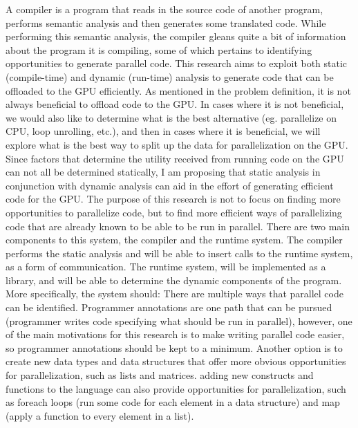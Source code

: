 \documentclass[a4paper,12pt]{article}
\newcommand{\tab}{\hspace*{2em}}
\begin{document}
A compiler is a program that reads in the source code of another program, performs semantic analysis and then generates some translated code.  While performing this semantic analysis, the compiler gleans quite a bit of information about the program it is compiling, some of which pertains to identifying opportunities to generate parallel code. This research aims to exploit both static (compile-time) and dynamic (run-time) analysis to generate code that can be offloaded to the GPU efficiently.  As mentioned in the problem definition, it is not always beneficial to offload code to the GPU.  In cases where it is not beneficial, we would also like to determine what is the best alternative (eg. parallelize on CPU, loop unrolling, etc.), and then in cases where it is beneficial, we will explore what is the best way to split up the data for parallelization on the GPU.  Since factors that determine the utility received from running code on the GPU can not all be determined statically, I am proposing that static analysis in conjunction with dynamic analysis can aid in the effort of generating efficient code for the GPU.  The purpose of this research is not to focus on finding more opportunities to parallelize code, but to find more efficient ways of parallelizing code that are already known to be able to be run in parallel. 
\newline\tab
There are two main components to this system, the compiler and the runtime system.  The compiler performs the static analysis and will be able to insert calls to the runtime system, as a form of communication.  The runtime system, will be implemented as a library, and will be able to determine the dynamic components of the program.  More specifically, the system should:
\newline\tab
There are multiple ways that parallel code can be identified.  Programmer annotations are one path that can be pursued (programmer writes code specifying what should be run in parallel)\cite{annotations}, however, one of the main motivations for this research is to make writing parallel code easier, so programmer annotations should be kept to a minimum.  Another option is to create new data types and data structures that offer more obvious opportunities for parallelization, such as lists and matrices.  adding new constructs and functions to the language can also provide opportunities for parallelization, such as foreach loops (run some code for each element in a data structure) and map (apply a function to every element in a list).
\end{document}
